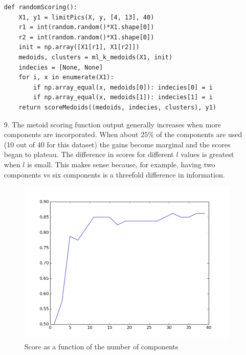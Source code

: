 \documentclass{article}
\begin{document}
\begin{enumerate}
\begin{lstlisting}
def randomScoring():
    X1, y1 = limitPics(X, y, [4, 13], 40)
    r1 = int(random.random()*X1.shape[0])
    r2 = int(random.random()*X1.shape[0])
    init = np.array([X1[r1], X1[r2]])
    medoids, clusters = ml_k_medoids(X1, init)
    indecies = [None, None]
    for i, x in enumerate(X1):
        if np.array_equal(x, medoids[0]): indecies[0] = i
        if np.array_equal(x, medoids[1]): indecies[1] = i
    return scoreMedoids((medoids, indecies, clusters), y1)
\end{lstlisting}

\newpage

\item[9.]
	The metoid scoring function output generally increases when more components are incorporated. When about 25\% of the components are used (10 out of 40 for this dataset) the gains become marginal and the scores began to plateau. The difference in scores for different $l$ values is greatest when $l$ is small. This makes sense because, for example, having two components vs six components is a threefold difference in information. 

\bigskip

	\begin{figure}[!htb]
	\begin{center}
	  \includegraphics[width=\linewidth]{../images/PCAscoring.png}
	  \caption{Score as a function of the number of components}
	\endminipage\hfill
	\end{center}
	\end{figure}

\bigskip


\end{enumerate}
\end{document}
